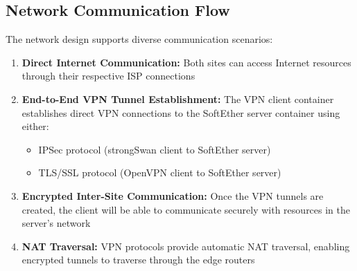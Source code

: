 \subsection{Network Communication Flow}

The network design supports diverse communication scenarios:

\begin{enumerate}
    \item \textbf{Direct Internet Communication:} Both sites can access Internet resources through their respective ISP connections
    
    \item \textbf{End-to-End VPN Tunnel Establishment:} The VPN client container establishes direct VPN connections to the SoftEther server container using either:
    \begin{itemize}
        \item IPSec protocol (strongSwan client to SoftEther server)
        \item TLS/SSL protocol (OpenVPN client to SoftEther server)
    \end{itemize}
    
    \item \textbf{Encrypted Inter-Site Communication:} Once the VPN tunnels are created, the client will be able to communicate securely with resources in the server's network
    
    \item \textbf{NAT Traversal:} VPN protocols provide automatic NAT traversal, enabling encrypted tunnels to traverse through the edge routers
\end{enumerate}




